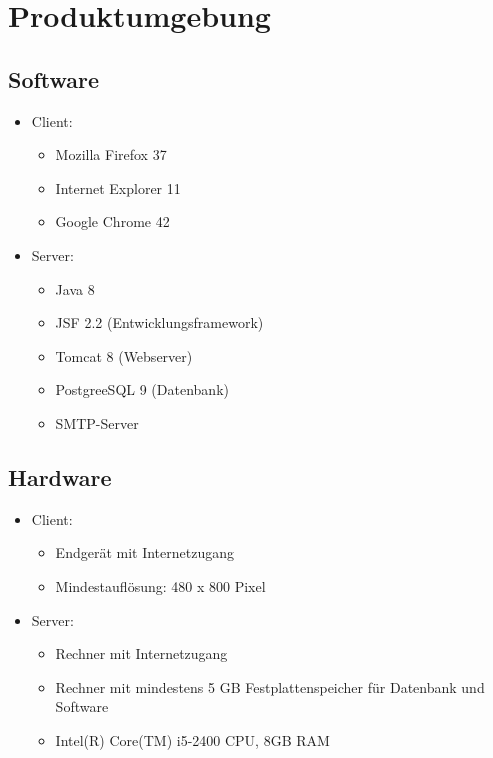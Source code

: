\documentclass[a4paper]{scrreprt}
\begin{document}
			
 
\chapter{Produktumgebung}
	\section{Software}
        \begin{itemize}
      		\item \gls{Client}:
	      		\begin{itemize}
	      			\item Mozilla Firefox 37
	      			\item Internet Explorer 11
	      			\item Google Chrome 42
	      		\end{itemize}
          	\item \gls{Server}:
	            \begin{itemize}
	            	\item Java 8
	            	\item \gls{JSF} 2.2 (Entwicklungsframework)
	            	\item \gls{Tomcat} 8 (Webserver)
	            	\item \gls{PostgreeSQL} 9 (Datenbank)  
	            	\item \gls{SMTP-Server}
	            \end{itemize}
        \end{itemize}
        
    \section{Hardware}   
        \begin{itemize}
          	\item Client:
	            \begin{itemize}
	            	\item Endgerät mit Internetzugang
	            	\item Mindestauflösung: 480 x 800 Pixel
	            \end{itemize}
          	\item Server:
	           \begin{itemize}
		           	\item Rechner mit Internetzugang
		           	\item Rechner mit mindestens 5 GB Festplattenspeicher für Datenbank und Software
		           	\item Intel(R) Core(TM) i5-2400 CPU, 8GB RAM 
	           \end{itemize}
        \end{itemize}
        
\end{document}
